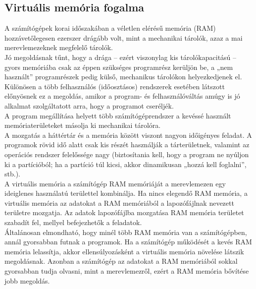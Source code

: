 \documentclass[tikz,12pt,margin=0px]{article}
\begin{document}
	\subsection*{Virtuális memória fogalma}
	
    \noindent A számítógépek korai időszakában a véletlen elérésű memória (RAM) hozzávetőlegesen ezerszer drágább volt, mint a mechanikai tárolók, azaz a mai merevlemezeknek megfelelő tárolók.\\

    \noindent Jó megoldásnak tűnt, hogy a drága – ezért viszonylag kis tárolókapacitású – gyors memóriába csak az éppen szükséges programrész kerüljön be, a „nem használt” programrészek pedig külső, mechanikus tárolókon helyezkedjenek el. Különösen a több felhasználós (időosztásos) rendszerek esetében látszott előnyösnek ez a megoldás, amikor a program- és felhasználóváltás amúgy is jó alkalmat szolgáltatott arra, hogy a programot cseréljék.\\

    \noindent A program megállítása helyett több számítógéprendszer a kevéssé használt memóriaterületeket másolja ki mechanikai tárolóra.\\

    \noindent A mozgatás a háttértár és a memória között viszont nagyon időigényes feladat. A programok rövid idő alatt csak kis részét használják a tárterületnek, valamint az operációs rendszer felelőssége nagy (biztosítania kell, hogy a program ne nyúljon ki a partícióból; ha a partíció túl kicsi, akkor dinamikusan „hozzá kell foglalni”, stb.).\\

    \noindent A virtuális memória a számítógép RAM memóriáját a merevlemezen egy ideiglenes használatú területtel kombinálja. Ha nincs elegendő RAM memória, a virtuális memória az adatokat a RAM memóriából a lapozófájlnak nevezett területre mozgatja. Az adatok lapozófájlba mozgatása RAM memória területet szabadít fel, mellyel befejezhetők a feladatok.\\

    \noindent Általánosan elmondható, hogy minél több RAM memória van a számítógépben, annál gyorsabban futnak a programok. Ha a számítógép működését a kevés RAM memória lelassítja, akkor ellensúlyozásként a virtuális memória növelése látszik megoldásnak. Azonban a számítógép az adatokat a RAM memóriából sokkal gyorsabban tudja olvasni, mint a merevlemezről, ezért a RAM memória bővítése jobb megoldás.\\
\end{document}
